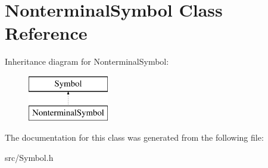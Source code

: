 \hypertarget{class_nonterminal_symbol}{}\section{Nonterminal\+Symbol Class Reference}
\label{class_nonterminal_symbol}
Inheritance diagram for Nonterminal\+Symbol\+:\begin{figure}[H]
\begin{center}
\leavevmode
\includegraphics[height=2.000000cm]{class_nonterminal_symbol}
\end{center}
\end{figure}


The documentation for this class was generated from the following file\+:\begin{DoxyCompactItemize}
\item 
src/Symbol.\+h\end{DoxyCompactItemize}
